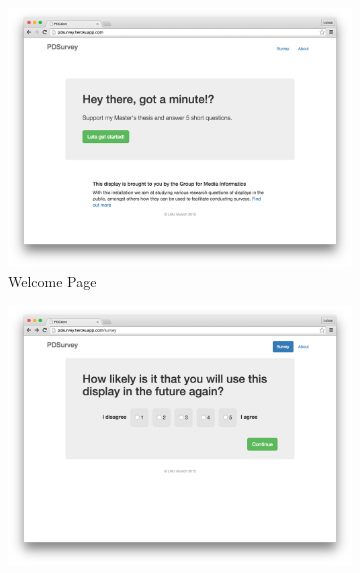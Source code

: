 


		\begin{figure}
		    \centering
		    \begin{subfigure}[b]{0.6\textwidth}
		        \centering
		        \includegraphics[width=\textwidth]{img/screenshots/pdclient/welcome}
		        \caption{Welcome Page}
		        \label{fig:4-pdclient-welcome}
		    \end{subfigure}
		    \hfill
		    \begin{subfigure}[b]{0.6\textwidth}
		        \centering
		        \includegraphics[width=\textwidth]{img/screenshots/pdclient/survey}

\end{subfigure}
\end{figure}
